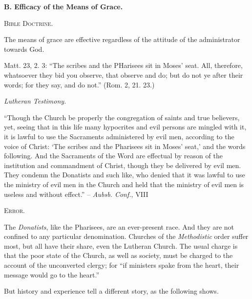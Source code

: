 \documentclass[
]{book}
\begin{document}
\begin{center}
\textbf{B.  Efficacy of the Means of Grace.}

\textsc{Bible Doctrine.}
\end{center}

The means of grace are effective regardless of the attitude of the administrator towards God.

Matt. 23, 2. 3: ``The scribes and the PHarisees sit in Moses' seat. All, therefore, whatsoever they bid you observe, that observe and do; but do not ye after their words; for they say, and do not.'' (Rom. 2, 21. 23.)

\begin{center}
\textsl{Lutheran Testimony.}
\end{center}

``Though the Church be properly the congregation of saints and true believers, yet, seeing that in this life many hypocrites and evil persons are mingled with it, it is lawful to use the Sacraments administered by evil men, according to the voice of Christ: `The scribes and the Pharisees sit in Moses' seat,' and the words following. And the Sacraments of the Word are effectual by reason of the institution and commandment of Christ, though they be delivered by evil men. They condemn the Donatists and such like, who denied that it was lawful to use the ministry of evil men in the Church and held that the ministry of evil men is useless and without effect.'' -- \emph{Aubsb. Conf.}, VIII

\begin{center}
\textsc{Error.}
\end{center}

The \emph{Donatists}, like the Pharisees, are an ever-present race. And they are not confined to any particular denomination. Churches of the \emph{Methodistic} order suffer most, but all have their share, even the Lutheran Church. The usual charge is that the poor state of the Church, as well as society, must be charged to the account of the unconverted clergy; for ``if ministers spake from the heart, their message would go to the heart.''

But history and experience tell a different story, as the following shows.
\end{document}
